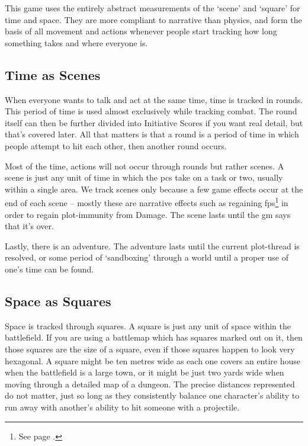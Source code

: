 \begin{multicols}{2}

\noindent
This game uses the entirely abstract measurements of the `scene' and `square' for time and space. They are more compliant to narrative than physics, and form the basis of all movement and actions whenever people start tracking how long something takes and where everyone is.

\subsection{Time as Scenes}

When everyone wants to talk and act at the same time, time is tracked in \glspl{round}.
This period of time is used almost exclusively while tracking combat.
The \gls{round} itself can then be further divided into Initiative Scores if you want real detail, but that's covered later.
All that matters is that a \gls{round} is a period of time in which people attempt to hit each other, then another \gls{round} occurs.

Most of the time, actions will not occur through \glspl{round} but rather scenes. A scene is just any unit of time in which the \glspl{pc} take on a task or two, usually within a single area. We track scenes only because a few game effects occur at the end of each scene -- mostly these are narrative effects such as regaining \glspl{fp}\footnote{See page \pageref{fate_points}.} in order to regain plot-immunity from Damage. The scene lasts until the \gls{gm} says that it's over.

Lastly, there is an adventure. The adventure lasts until the current plot-thread is resolved, or some period of `sandboxing' through a world until a proper use of one's time can be found.

\subsection{Space as Squares}

Space is tracked through \glspl{square}.
A \gls{square} is just any unit of space within the battlefield.
If you are using a battlemap which has squares marked out on it, then those squares are the size of a square, even if those squares happen to look very hexagonal.
A square might be ten metres wide as each one covers an entire house when the battlefield is a large town, or it might be just two yards wide when moving through a detailed map of a dungeon.
The precise distances represented do not matter, just so long as they consistently balance one character's ability to run away with another's ability to hit someone with a projectile.


\end{multicols}
